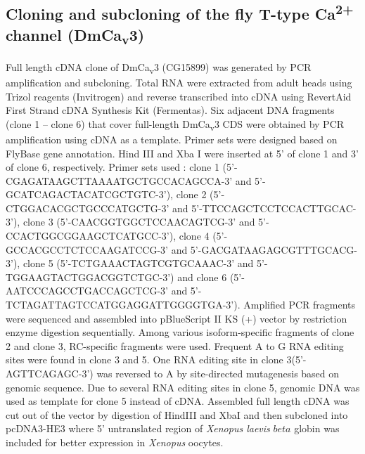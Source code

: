 \subsection*{Cloning and subcloning of the fly T-type Ca\textsuperscript{2+} channel (DmCa\textsubscript{v}3)}

Full length cDNA clone of DmCa\textsubscript{v}3 (CG15899) was generated by PCR amplification and subcloning.
Total RNA were extracted from adult heads using Trizol reagents (Invitrogen) and reverse transcribed into cDNA using RevertAid First Strand cDNA Synthesis Kit (Fermentas).
Six adjacent DNA fragments (clone 1 – clone 6) that cover full-length DmCa\textsubscript{v}3 CDS were obtained by PCR amplification using cDNA as a template. 
Primer sets were designed based on FlyBase gene annotation. 
Hind III and Xba I were inserted at 5' of clone 1 and 3' of clone 6, respectively.
Primer sets used : clone 1 (5'-CGAGATAAGCTTAAAATGCTGCCACAGCCA-3' and 5'-GCATCAGACTACATCGCTGTC-3'), clone 2 (5'-CTGGACACGCTGCCCATGCTG-3' and 5'-TTCCAGCTCCTCCACTTGCAC-3'), clone 3 (5'-CAACGGTGGCTCCAACAGTCG-3' and 5'-CCACTGGCGGAAGCTCATGCC-3'), clone 4 (5'-GCCACGCCTCTCCAAGATCCG-3' and 5'-GACGATAAGAGCGTTTGCACG-3'), clone 5 (5'-TCTGAAACTAGTCGTGCAAAC-3' and 5'-TGGAAGTACTGGACGGTCTGC-3') and clone 6 (5'-AATCCCAGCCTGACCAGCTCG-3' and 5'-TCTAGATTAGTCCATGGAGGATTGGGGTGA-3').
Amplified PCR fragments were sequenced and assembled into pBlueScript II KS (+) vector by restriction enzyme digestion sequentially.
Among various isoform-specific fragments of clone 2 and clone 3, RC-specific fragments were used.
Frequent A to G RNA editing sites were found in clone 3 and 5.
One RNA editing site in clone 3(5'-AGTTCAGAGC-3') was reversed to A by site-directed mutagenesis based on genomic sequence.
Due to several RNA editing sites in clone 5, genomic DNA was used as template for clone 5 instead of cDNA.
Assembled full length cDNA was cut out of the vector by digestion of HindIII and XbaI and then subcloned into pcDNA3-HE3 where 5' untranslated region of \emph{Xenopus laevis} $beta$ globin was included for better expression in \emph{Xenopus} oocytes.
    
  